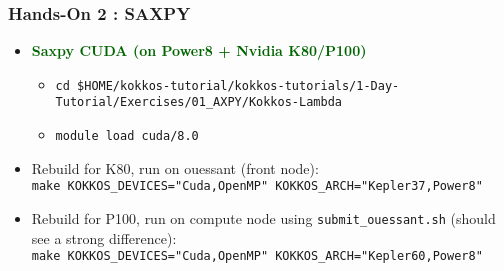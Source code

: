 \begin{frame}[fragile=singleslide]
  \frametitle{Hands-On 2 : SAXPY}

  \begin{itemize}
  \item \textcolor{darkgreen}{\textbf{Saxpy CUDA (on Power8 + Nvidia K80/P100)}}
    \begin{itemize}
    \item \texttt{cd \$HOME/kokkos-tutorial/kokkos-tutorials/1-Day-Tutorial/Exercises/01\_AXPY/Kokkos-Lambda}
    \item \texttt{module load cuda/8.0}
    \end{itemize}
  \item Rebuild for K80, run on ouessant (front node):\\
    \texttt{make KOKKOS\_DEVICES="Cuda,OpenMP" KOKKOS\_ARCH="Kepler37,Power8"}
  \item Rebuild for P100, run on compute node using \texttt{submit\_ouessant.sh} (should see a strong difference):\\
    \texttt{make KOKKOS\_DEVICES="Cuda,OpenMP" KOKKOS\_ARCH="Kepler60,Power8"}
  \end{itemize}
\end{frame}


